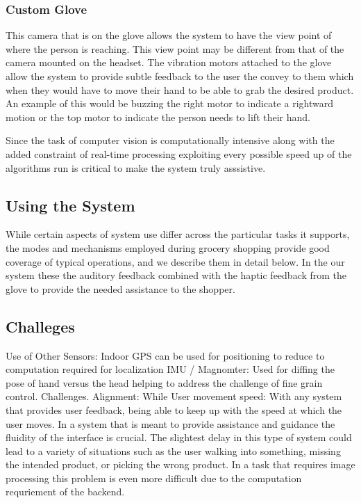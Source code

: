 \subsubsection{Custom Glove}
This camera that is on the glove allows the system
to have the view point of where the person is reaching. This view
point may be different from that of the camera mounted on the headset.
The vibration motors attached to the glove allow the system to provide
subtle feedback to the user the convey to them which when they would
have to move their hand to be able to grab the desired product. An
example of this would be buzzing the right motor to indicate a
rightward motion or the top motor to indicate the person needs to lift
their hand.

Since the task of computer vision is computationally intensive along
with the added constraint of real-time processing exploiting every
possible speed up of the algorithms run is critical to make the system truly asssistive.

\subsection{Using the System}
While certain aspects of system use differ across the particular tasks it supports, the modes and mechanisms employed during grocery shopping provide good coverage of typical operations, and we describe them in detail below.
In the our system these the auditory feedback combined with the haptic feedback from the glove
to provide the needed assistance to the shopper. 

\subsection{Challeges}
Use of Other Sensors:
    Indoor GPS
        can be used for positioning to reduce to computation required for localization
    IMU / Magnomter:
        Used for diffing the pose of hand versus the head helping to address the challenge of fine grain control.
Challenges.
    Alignment:
        While 
    User movement speed:
        With any system that provides user feedback, being able to keep up with the speed at which the user moves. In a system that is meant to provide assistance and guidance the fluidity of the interface is crucial. The slightest delay in this type of system could lead to a variety of situations such as the user walking into something, missing the intended product, or picking the wrong product. In a task that requires image processing this problem is even more difficult due to the computation requriement of the backend.



